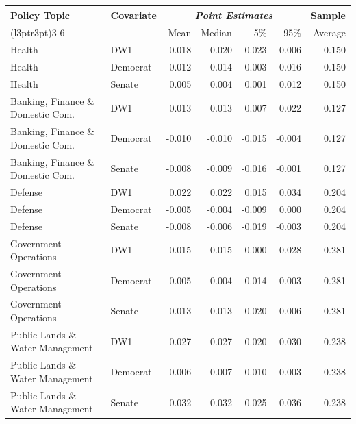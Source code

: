 
\begin{tabular}{llrrrrr}
\toprule
\multirow{2}{*}{Policy Topic} & \multirow{2}{*}{Covariate} & \multicolumn{4}{c}{\textit{Point Estimates}} & Sample\\
\cmidrule(l{3pt}r{3pt}){3-6}
& & Mean & Median & 5\% & 95\% & Average\\
\midrule
Health & DW1 & -0.018 & -0.020 & -0.023 & -0.006 & 0.150\\
Health & Democrat & 0.012 & 0.014 & 0.003 & 0.016 & 0.150\\
Health & Senate & 0.005 & 0.004 & 0.001 & 0.012 & 0.150\\
\midrule
Banking, Finance \& Domestic Com. & DW1 & 0.013 & 0.013 & 0.007 & 0.022 & 0.127\\
Banking, Finance \& Domestic Com. & Democrat & -0.010 & -0.010 & -0.015 & -0.004 & 0.127\\
Banking, Finance \& Domestic Com. & Senate & -0.008 & -0.009 & -0.016 & -0.001 & 0.127\\
\midrule
Defense & DW1 & 0.022 & 0.022 & 0.015 & 0.034 & 0.204\\
Defense & Democrat & -0.005 & -0.004 & -0.009 & 0.000 & 0.204\\
Defense & Senate & -0.008 & -0.006 & -0.019 & -0.003 & 0.204\\
\midrule
Government Operations & DW1 & 0.015 & 0.015 & 0.000 & 0.028 & 0.281\\
Government Operations & Democrat & -0.005 & -0.004 & -0.014 & 0.003 & 0.281\\
Government Operations & Senate & -0.013 & -0.013 & -0.020 & -0.006 & 0.281\\
\midrule
Public Lands \& Water Management & DW1 & 0.027 & 0.027 & 0.020 & 0.030 & 0.238\\
Public Lands \& Water Management & Democrat & -0.006 & -0.007 & -0.010 & -0.003 & 0.238\\
Public Lands \& Water Management & Senate & 0.032 & 0.032 & 0.025 & 0.036 & 0.238\\
\bottomrule
\end{tabular}
